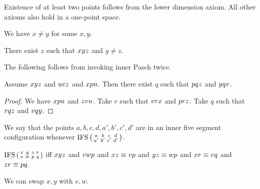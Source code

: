\documentclass[10pt,a4paper,parskip=half,numbers=endperiod,parskip]{scrartcl}
\begin{document}
  Existence of at least two points follows from the lower dimension axiom.
  All other axioms also hold in a one-point space.

  \begin{forthel}
    \begin{lemma} %
      We have $x \neq y$ for some $x, y$.
    \end{lemma}

    \begin{lemma} %
      There exist $z$ such that $x y z$ and $y \neq z$.
    \end{lemma}
  \end{forthel}

  The following follows from invoking inner Pasch twice.

  \begin{forthel}
    \begin{lemma} %
      Assume $x y z$ and $u v z$ and $x p u$.
      Then there exist $q$ such that $p q z$ and $y q v$.
    \end{lemma}
    \begin{proof}
      We have $x p u$ and $z v u$.
    	Take $r$ such that $v r x$ and $p r z$. %
    	Take $q$ such that $r q z$ and $v q y$. %
    \end{proof}
  \end{forthel}


  We say that the points $a,b,c,d,a',b',c',d'$ are
  in an inner five segment configuration
  whenever $\operatorname{IFS} \left( \begin{smallmatrix} a & b & c & d \\ a' & b' & c' & d' \end{smallmatrix} \right)$.

  \begin{forthel}
    \begin{definition} %
      $\operatorname{IFS} \left( \begin{smallmatrix} x & y & z & r \\ v & w & p & q \end{smallmatrix} \right)$ iff
      $x y z$ and $v w p$
      and $x z \equiv v p$ and $y z \equiv w p$
      and $x r \equiv v q$ and $z r \equiv p q$.
    \end{definition}
  \end{forthel}

  We can swap $x, y$ with $v, w$.
\end{document}

